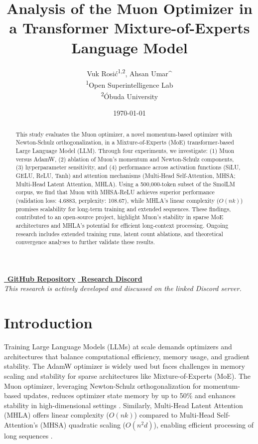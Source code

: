 \documentclass[11pt, a4paper]{article}
\title{\textbf{Analysis of the Muon Optimizer in a Transformer Mixture-of-Experts Language Model}}
\author{
    Vuk Rosić\textsuperscript{1,2}, Ahsan Umar^{\orcidlink{0009-0005-8823-2686}} \\
    \textsuperscript{1}Open Superintelligence Lab \\
    \textsuperscript{2}Óbuda University
}
\date{\today}
\begin{document}
\maketitle

\begin{abstract}
This study evaluates the Muon optimizer, a novel momentum-based optimizer with Newton-Schulz orthogonalization, in a Mixture-of-Experts (MoE) transformer-based Large Language Model (LLM). Through four experiments, we investigate: (1) Muon versus AdamW, (2) ablation of Muon’s momentum and Newton-Schulz components, (3) hyperparameter sensitivity, and (4) performance across activation functions (SiLU, GELU, ReLU, Tanh) and attention mechanisms (Multi-Head Self-Attention, MHSA; Multi-Head Latent Attention, MHLA). Using a 500,000-token subset of the SmolLM corpus, we find that Muon with MHSA-ReLU achieves superior performance (validation loss: 4.6883, perplexity: 108.67), while MHLA’s linear complexity (\(O(nk)\)) promises scalability for long-term training and extended sequences. These findings, contributed to an open-source project, highlight Muon’s stability in sparse MoE architectures and MHLA’s potential for efficient long-context processing. Ongoing research includes extended training runs, latent count ablations, and theoretical convergence analyses to further validate these results.
\end{abstract}

\begin{center}
    \vspace{1em}
    \href{https://github.com/vukrosic/analysis-of-muon-optimizer-in-llms}{\faGithub~\textbf{GitHub Repository}} \quad
    \href{https://discord.gg/6AbXGpKTwN}{\faDiscord~\textbf{Research Discord}} \\
    \small\textit{This research is actively developed and discussed on the linked Discord server.}
\end{center}

\section{Introduction}
Training Large Language Models (LLMs) at scale demands optimizers and architectures that balance computational efficiency, memory usage, and gradient stability. The AdamW optimizer \cite{loshchilov2017decoupled, kingma2014adam} is widely used but faces challenges in memory scaling and stability for sparse architectures like Mixture-of-Experts (MoE). The Muon optimizer, leveraging Newton-Schulz orthogonalization for momentum-based updates, reduces optimizer state memory by up to 50\% and enhances stability in high-dimensional settings \cite{bernstein2020metricizing, liu2025muon, jordan2024muon}. Similarly, Multi-Head Latent Attention (MHLA) offers linear complexity (\(O(nk)\)) compared to Multi-Head Self-Attention’s (MHSA) quadratic scaling (\(O(n^2d)\)), enabling efficient processing of long sequences \cite{jaegle2021perceiver, li2025transmla}.
\end{document}
